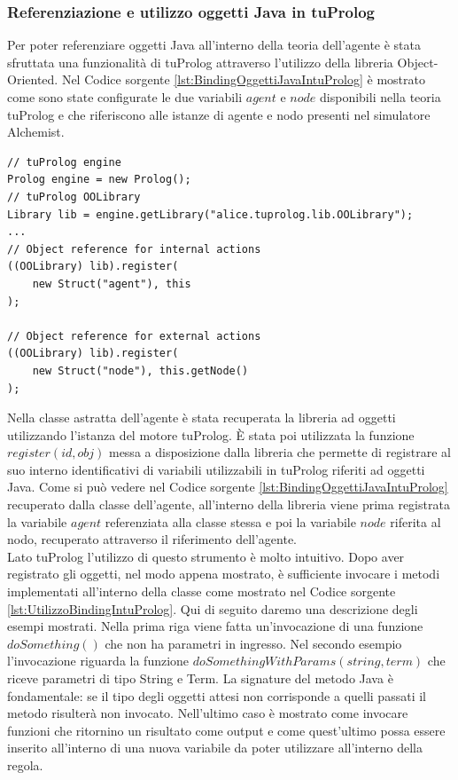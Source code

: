 \subsubsection{Referenziazione e utilizzo oggetti Java in tuProlog}
Per poter referenziare oggetti Java all'interno della teoria dell'agente è stata sfruttata una funzionalità di tuProlog attraverso l'utilizzo della libreria Object-Oriented. Nel Codice sorgente \ref{lst:BindingOggettiJavaIntuProlog} è mostrato come sono state configurate le due variabili $agent$ e $node$ disponibili nella teoria tuProlog e che riferiscono alle istanze di agente e nodo presenti nel simulatore Alchemist.
\begin{lstlisting}[firstnumber=1,label={lst:BindingOggettiJavaIntuProlog},caption={Binding oggetti Java in tuProlog}]
// tuProlog engine
Prolog engine = new Prolog();
// tuProlog OOLibrary
Library lib = engine.getLibrary("alice.tuprolog.lib.OOLibrary");
...
// Object reference for internal actions
((OOLibrary) lib).register(
	new Struct("agent"), this
);

// Object reference for external actions
((OOLibrary) lib).register(
	new Struct("node"), this.getNode()
);
\end{lstlisting}
Nella classe astratta dell'agente è stata recuperata la libreria ad oggetti utilizzando l'istanza del motore tuProlog.
\`E stata poi utilizzata la funzione $register(id, obj)$ messa a disposizione dalla libreria che permette di registrare al suo interno identificativi di variabili utilizzabili in tuProlog riferiti ad oggetti Java.
Come si può vedere nel Codice sorgente \ref{lst:BindingOggettiJavaIntuProlog} recuperato dalla classe dell'agente, all'interno della libreria viene prima registrata la variabile $agent$ referenziata alla classe stessa e poi la variabile $node$ riferita al nodo, recuperato attraverso il riferimento dell'agente.
\\
Lato tuProlog l'utilizzo di questo strumento è molto intuitivo. Dopo aver registrato gli oggetti, nel modo appena mostrato, è sufficiente invocare i metodi implementati all'interno della classe come mostrato nel Codice sorgente \ref{lst:UtilizzoBindingIntuProlog}. Qui di seguito daremo una descrizione degli esempi mostrati.
Nella prima riga viene fatta un'invocazione di una funzione $doSomething()$ che non ha parametri in ingresso.
Nel secondo esempio l'invocazione riguarda la funzione $doSomethingWithParams(string, term)$ che riceve parametri di tipo String e Term. La signature del metodo Java è fondamentale: se il tipo degli oggetti attesi non corrisponde a quelli passati il metodo risulterà non invocato.
Nell'ultimo caso è mostrato come invocare funzioni che ritornino un risultato come output e come quest'ultimo possa essere inserito all'interno di una nuova variabile da poter utilizzare all'interno della regola.


